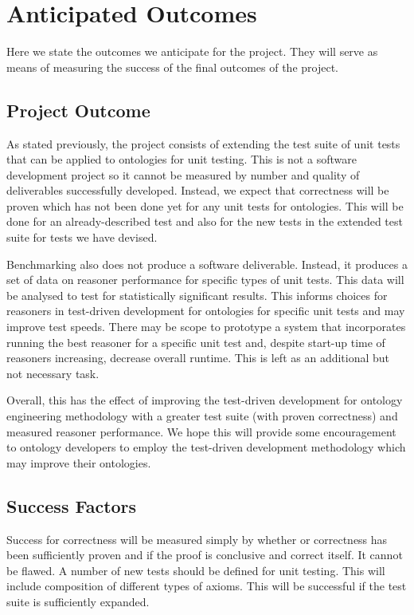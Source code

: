 \documentclass[draft]{sig-alternate}
\begin{document}
\section{Anticipated Outcomes}

Here we state the outcomes we anticipate for the project. They will serve as means of measuring the success of the final outcomes of the project.

\subsection{Project Outcome}

As stated previously, the project consists of extending the test suite of unit tests that can be applied to ontologies for unit testing. This is not a software development project so it cannot be measured by number and quality of deliverables successfully developed. Instead, we expect that correctness will be proven which has not been done yet for any unit tests for ontologies. This will be done for an already-described test and also for the new tests in the extended test suite for tests we have devised.

Benchmarking also does not produce a software deliverable. Instead, it produces a set of data on reasoner performance for specific types of unit tests. This data will be analysed to test for statistically significant results. This informs choices for reasoners in test-driven development for ontologies for specific unit tests and may improve test speeds. There may be scope to prototype a system that incorporates running the best reasoner for a specific unit test and, despite start-up time of reasoners increasing, decrease overall runtime. This is left as an additional but not necessary task.

Overall, this has the effect of improving the test-driven development for ontology engineering methodology with a greater test suite (with proven correctness) and measured reasoner performance. We hope this will provide some encouragement to ontology developers to employ the test-driven development methodology which may improve their ontologies.

\subsection{Success Factors}

Success for correctness will be measured simply by whether or correctness has been sufficiently proven and if the proof is conclusive and correct itself. It cannot be flawed. A number of new tests should be defined for unit testing. This will include composition of different types of axioms. This will be successful if the test suite is sufficiently expanded.
\end{document}
